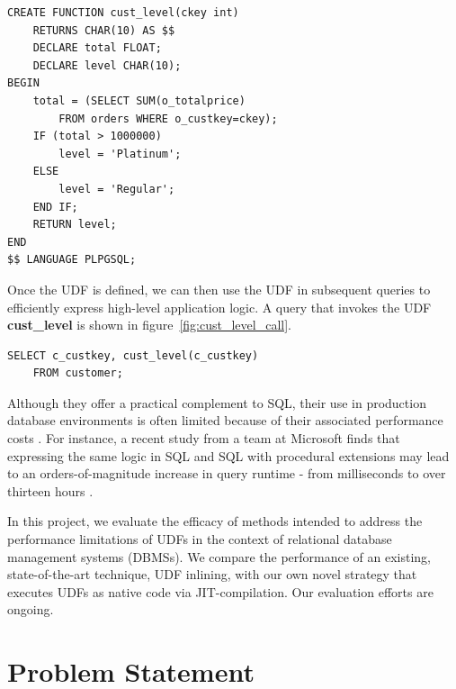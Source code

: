 \documentclass{vldb}
\newcommand{\dbCode}[1]{{\sffamily\small \textbf{#1}}\xspace}
\begin{document}
\begin{listing}[H]
    \begin{verbatim}
CREATE FUNCTION cust_level(ckey int)
    RETURNS CHAR(10) AS $$
    DECLARE total FLOAT;
    DECLARE level CHAR(10);
BEGIN
    total = (SELECT SUM(o_totalprice) 
        FROM orders WHERE o_custkey=ckey);
    IF (total > 1000000)
        level = 'Platinum';
    ELSE
        level = 'Regular';
    END IF;
    RETURN level;
END 
$$ LANGUAGE PLPGSQL;
    \end{verbatim}
    \caption{The definition of UDF \dbCode{cust\_level}.}
    \label{fig:cust_level_def}
\end{listing}

Once the UDF is defined, we can then use the UDF in subsequent queries to efficiently express high-level application logic. A query that invokes the UDF \dbCode{cust\_level} is shown in figure~\ref{fig:cust_level_call}.
    
\begin{listing}[H]
    \begin{verbatim}
SELECT c_custkey, cust_level(c_custkey)
    FROM customer;
    \end{verbatim}
    \caption{The invocation of UDF \dbCode{cust\_level}.}
    \label{fig:cust_level_call}
\end{listing}

Although they offer a practical complement to SQL, their use in production database environments is often limited because of their associated performance costs \cite{froid, apfel}. For instance, a recent study from a team at Microsoft finds that expressing the same logic in SQL and SQL with procedural extensions may lead to an orders-of-magnitude increase in query runtime - from milliseconds to over thirteen hours \cite{froid}.

In this project, we evaluate the efficacy of methods intended to address the performance limitations of UDFs in the context of relational database management systems (DBMSs). We compare the performance of an existing, state-of-the-art technique, UDF inlining, with our own novel strategy that executes UDFs as native code via JIT-compilation. Our evaluation efforts are ongoing.


\section{Problem Statement}
\end{document}
